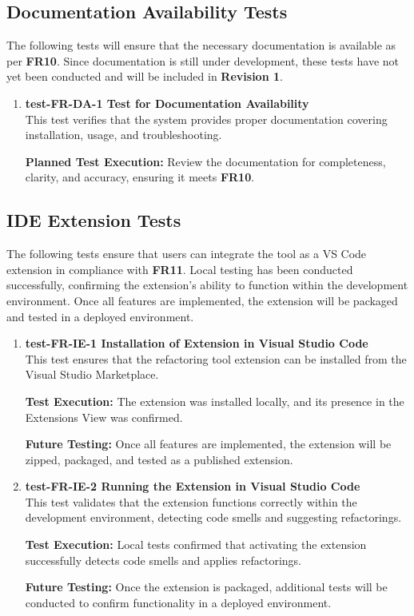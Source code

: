 \documentclass[12pt, titlepage]{article}
\begin{document}
\subsection{Documentation Availability Tests}
The following tests will ensure that the necessary documentation is
available as per \textbf{FR10}. Since documentation is still under
development, these tests have not yet been conducted and will be
included in \textbf{Revision 1}.

\begin{enumerate}
  \item \textbf{test-FR-DA-1 Test for Documentation Availability} \\[2mm]
    This test verifies that the system provides proper documentation
    covering installation, usage, and troubleshooting.

    \textbf{Planned Test Execution:} Review the documentation for
    completeness, clarity, and accuracy, ensuring it meets \textbf{FR10}.
\end{enumerate}

\subsection{IDE Extension Tests}
The following tests ensure that users can integrate the tool as a VS
Code extension in compliance with \textbf{FR11}. Local testing has
been conducted successfully, confirming the extension's ability to
function within the development environment. Once all features are
implemented, the extension will be packaged and tested in a deployed
environment.

\begin{enumerate}
  \item \textbf{test-FR-IE-1 Installation of Extension in Visual
    Studio Code} \\[2mm]
    This test ensures that the refactoring tool extension can be
    installed from the Visual Studio Marketplace.

    \textbf{Test Execution:} The extension was installed locally, and
    its presence in the Extensions View was confirmed.

    \textbf{Future Testing:} Once all features are implemented, the
    extension will be zipped, packaged, and tested as a published extension.

  \item \textbf{test-FR-IE-2 Running the Extension in Visual Studio
    Code} \\[2mm]
    This test validates that the extension functions correctly within
    the development environment, detecting code smells and suggesting
    refactorings.

    \textbf{Test Execution:} Local tests confirmed that activating
    the extension successfully detects code smells and applies refactorings.

    \textbf{Future Testing:} Once the extension is packaged,
    additional tests will be conducted to confirm functionality in a
    deployed environment.
\end{enumerate}
\end{document}
